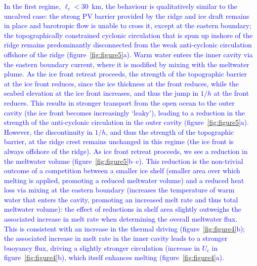\documentclass[draft]{agujournal2019}
\newcommand{\blue}[1]{\textcolor{blue}{#1}}
\begin{document}
\blue{In the first regime, $\ell_c < 30$~km, the behaviour is qualitatively similar to the uncalved case: the strong PV barrier provided by the ridge and ice draft remains in place and barotropic flow is unable to cross it, except at the eastern boundary; the topographically constrained cyclonic circulation that is spun up inshore of the ridge remains predominantly disconnected from the weak anti-cyclonic circulation offshore of the ridge (figure~\ref{fig:figure5}a). Warm water enters the inner cavity via the eastern boundary current, where it is modified by mixing with the meltwater plume. As the ice front retreat proceeds, the strength of the topographic barrier at the ice front reduces, since the ice thickness at the front reduces, while the seabed elevation at the ice front increases, and thus the jump in $1/h$ at the front reduces. This results in stronger transport from the open ocean to the outer cavity (the ice front becomes increasingly `leaky'), leading to a reduction in the strength of the anti-cyclonic circulation in the outer cavity (figure~\ref{fig:figure5}a). However, the discontinuity in $1/h$, and thus the strength of the topographic barrier, at the ridge crest remains unchanged in this regime (the ice front is always offshore of the ridge). As ice front retreat proceeds, we see a reduction in the meltwater volume (figure~\ref{fig:figure5}b--c). This reduction is the non-trivial outcome of a competition between a smaller ice shelf (smaller area over which melting is applied, promoting a reduced meltwater volume) and a reduced heat loss via mixing at the eastern boundary (increases the temperature of warm water that enters the cavity, promoting an increased melt rate and thus total meltwater volume): the effect of reductions in shelf area slightly outweighs the associated increase in melt rate when determining the overall meltwater flux. This is consistent with an increase in the thermal driving (figure~\ref{fig:figure4}b); the associated increase in melt rate in the inner cavity leads to a stronger buoyancy flux, driving a slightly stronger circulation (increase in $U_e$ in figure~\ref{fig:figure4}b), which itself enhances melting (figure~\ref{fig:figure4}a).}
\end{document}
